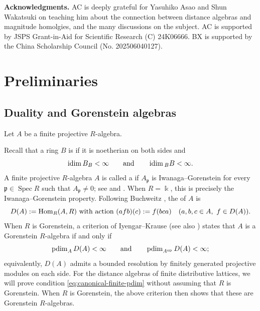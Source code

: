 \documentclass[a4paper,leqno]{amsart}
\begin{document}
\medskip
\noindent
\textbf{Acknowledgments.}
AC is deeply grateful for Yasuhiko Asao and Shun Wakatsuki on teaching him about the connection between distance algebras and magnitude homolgies, and the many discussions on the subject.
AC is supported by JSPS Grant-in-Aid for Scientific Research (C) 24K06666. BX is supported by the China Scholarship Council (No. 202506040127).


\section{Preliminaries}
\label{sec:preliminaries}



\subsection{Duality and Gorenstein algebras}
\label{subsec:duality-gorenstein}

Let $A$ be a finite projective $R$-algebra.

Recall that a ring $B$ is  if it is noetherian on both sides and
\[
 \operatorname{idim} B_B<\infty
 \qquad\text{and}\qquad
 \operatorname{idim} {}_B B<\infty.
\]
A finite projective $R$-algebra $A$ is called a  if $A_{\mathfrak p}$ is Iwanaga--Gorenstein for every $\mathfrak p\in\operatorname{Spec}R$ such that $A_{\mathfrak p}\neq0$; see \cite[Definition~1.1]{IK22} and \cite[Definition~6.1]{GIK23}. When $R=\Bbbk$, this is precisely the Iwanaga--Gorenstein property.
Following Buchweitz \cite[Section~7.6]{Buc21}, the  of $A$ is
\[
 D(A):=\operatorname{Hom}_R(A,R) \text{ with action } (a f b)(c):=f(bca)
 \quad(a,b,c\in A,\ f\in D(A)).
\]
When $R$ is Gorenstein, a criterion of Iyengar--Krause \cite[Theorem~4.6]{IK22} (see also \cite[Theorem~6.7]{GIK23}) states that $A$ is a Gorenstein $R$-algebra if and only if
\begin{equation}
 \operatorname{pdim}_A D(A)<\infty
 \qquad\text{and}\qquad
 \operatorname{pdim}_{A^{\operatorname{op}}}D(A)<\infty;
 \label{eq:canonical-finite-pdim}
\end{equation}
equivalently, $D(A)$ admits a bounded resolution by finitely generated projective modules on each side.  For the distance algebras of finite distributive lattices, we will prove condition \eqref{eq:canonical-finite-pdim} without assuming that $R$ is Gorenstein.  When $R$ is Gorenstein, the above criterion then shows that these are Gorenstein $R$-algebras.
\end{document}

